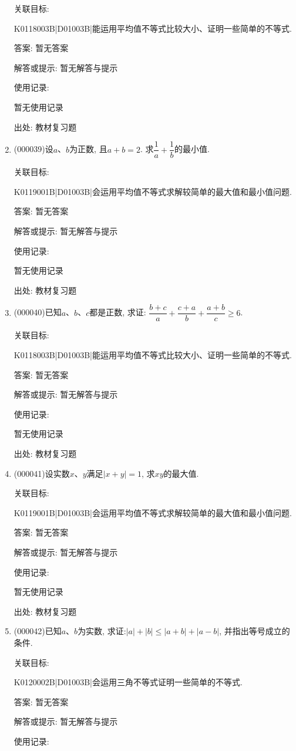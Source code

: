 \documentclass[10pt,a4paper]{article}
\begin{document}
\begin{enumerate}[1.]
关联目标:

K0118003B|D01003B|能运用平均值不等式比较大小、证明一些简单的不等式.

答案: 暂无答案

解答或提示: 暂无解答与提示

使用记录:

暂无使用记录


出处: 教材复习题
\item { (000039)}设$a$、$b$为正数, 且$a+b=2$. 求$\dfrac 1a+\dfrac 1b$的最小值.


关联目标:

K0119001B|D01003B|会运用平均值不等式求解较简单的最大值和最小值问题.

答案: 暂无答案

解答或提示: 暂无解答与提示

使用记录:

暂无使用记录


出处: 教材复习题
\item { (000040)}已知$a$、$b$、$c$都是正数, 求证: $\dfrac{b+c}{a}+\dfrac{c+a}{b}+\dfrac{a+b}{c}\ge 6$.


关联目标:

K0118003B|D01003B|能运用平均值不等式比较大小、证明一些简单的不等式.

答案: 暂无答案

解答或提示: 暂无解答与提示

使用记录:

暂无使用记录


出处: 教材复习题
\item { (000041)}设实数$x$、$y$满足$|x+y|=1$, 求$xy$的最大值.


关联目标:

K0119001B|D01003B|会运用平均值不等式求解较简单的最大值和最小值问题.

答案: 暂无答案

解答或提示: 暂无解答与提示

使用记录:

暂无使用记录


出处: 教材复习题
\item { (000042)}已知$a$、$b$为实数, 求证:$|a|+|b| \le |a+b| +|a-b|$, 并指出等号成立的条件.


关联目标:

K0120002B|D01003B|会运用三角不等式证明一些简单的不等式.

答案: 暂无答案

解答或提示: 暂无解答与提示

使用记录:


\end{enumerate}
\end{document}
